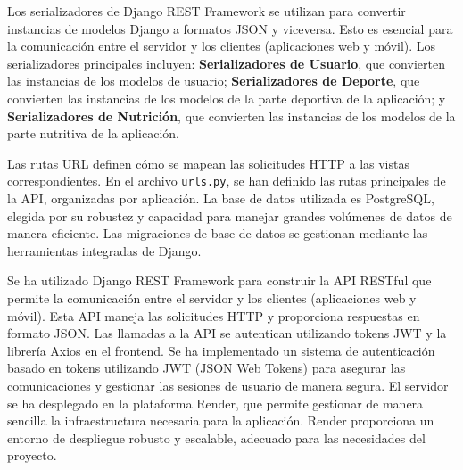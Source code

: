 Los serializadores  de Django REST Framework se utilizan para convertir instancias de modelos Django a formatos JSON y viceversa. Esto es esencial para la comunicación entre el servidor y los clientes (aplicaciones web y móvil). Los serializadores principales incluyen: \textbf{Serializadores de Usuario}, que convierten las instancias de los modelos de usuario; \textbf{Serializadores de Deporte}, que convierten las instancias de los modelos de la parte deportiva de la aplicación; y \textbf{Serializadores de Nutrición}, que convierten las instancias de los modelos de la parte nutritiva de la aplicación.

Las rutas URL  definen cómo se mapean las solicitudes HTTP a las vistas correspondientes. En el archivo \texttt{urls.py}, se han definido las rutas principales de la API, organizadas por aplicación. La base de datos  utilizada es PostgreSQL, elegida por su robustez y capacidad para manejar grandes volúmenes de datos de manera eficiente. Las migraciones de base de datos se gestionan mediante las herramientas integradas de Django.

Se ha utilizado Django REST Framework para construir la API RESTful  que permite la comunicación entre el servidor y los clientes (aplicaciones web y móvil). Esta API maneja las solicitudes HTTP y proporciona respuestas en formato JSON. Las llamadas a la API  se autentican utilizando tokens JWT y la librería Axios en el frontend. Se ha implementado un sistema de autenticación basado en tokens utilizando JWT (JSON Web Tokens) para asegurar las comunicaciones y gestionar las sesiones de usuario de manera segura. El servidor se ha desplegado en la plataforma Render, que permite gestionar de manera sencilla la infraestructura necesaria para la aplicación. Render proporciona un entorno de despliegue robusto y escalable, adecuado para las necesidades del proyecto.
